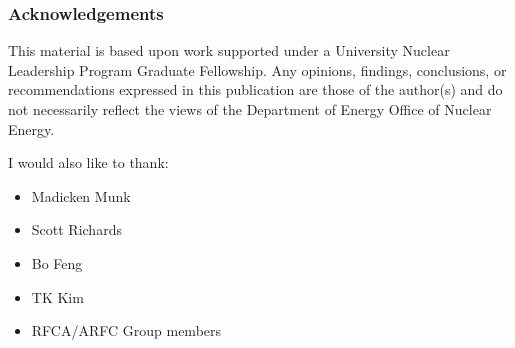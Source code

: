 \begin{frame}
    \frametitle{Acknowledgements}
    This material is based upon work supported under a University 
        Nuclear Leadership Program Graduate Fellowship. Any opinions, findings, conclusions, or 
    recommendations expressed in this publication are those of the author(s) 
    and do not necessarily reflect the views of the Department of Energy Office 
    of Nuclear Energy.
        
    I would also like to thank:
    \begin{itemize}
        \item Madicken Munk
        \item Scott Richards
        \item Bo Feng
        \item TK Kim
        \item RFCA/ARFC Group members
    \end{itemize}

\end{frame}